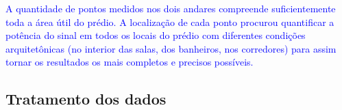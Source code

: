 \textcolor{blue}{A quantidade de pontos medidos nos dois andares compreende suficientemente toda a área útil do prédio. A localização de cada ponto procurou quantificar a potência do sinal em todos os locais do prédio com diferentes condições arquitetônicas (no interior das salas, dos banheiros, nos corredores) para assim tornar os resultados os mais completos e precisos possíveis.}

\begin{figure}[H]
	\centering
\end{figure}

\begin{figure}[H]
	\centering
\end{figure}

\subsection{Tratamento dos dados}
\label{subsec:tratamento-dos-dados}

